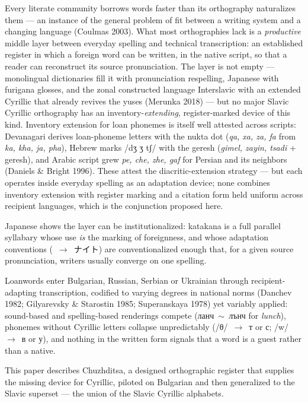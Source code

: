 \documentclass[12pt]{article}
\newcommand{\cz}[1]{{\chu #1}}
\newcommand{\ph}[1]{{\ipafont/#1/}}
\newcommand{\phon}[1]{{\ipafont[#1]}}
\newcommand{\src}[1]{{\ipafont #1}}
\begin{document}
Every literate community borrows words faster than its orthography naturalizes them — an instance of the general problem of fit between a writing system and a changing language (Coulmas 2003). What most orthographies lack is a \emph{productive} middle layer between everyday spelling and technical transcription: an established register in which a foreign word can be written, in the native script, so that a reader can reconstruct its source pronunciation. The layer is not empty — monolingual dictionaries fill it with pronunciation respelling, Japanese with furigana glosses, and the zonal constructed language Interslavic with an extended Cyrillic that already revives the yuses (Merunka 2018) — but no major Slavic Cyrillic orthography has an inventory-\emph{extending}, register-marked device of this kind. Inventory extension for loan phonemes is itself well attested across scripts: Devanagari derives loan-phoneme letters with the nukta dot (\emph{qa, xa, za, fa} from \emph{ka, kha, ja, pha}), Hebrew marks \ph{dʒ ʒ tʃ} with the geresh (\emph{gimel, zayin, tsadi} + geresh), and Arabic script grew \emph{pe, che, zhe, gaf} for Persian and its neighbors (Daniels \& Bright 1996). These attest the diacritic-extension strategy — but each operates inside everyday spelling as an adaptation device; none combines inventory extension with register marking and a citation form held uniform across recipient languages, which is the conjunction proposed here.

Japanese shows the layer can be institutionalized: katakana is a full parallel syllabary whose use \emph{is} the marking of foreignness, and whose adaptation conventions (\phon{naɪt}~$\rightarrow$~\src{ナイト}) are conventionalized enough that, for a given source pronunciation, writers usually converge on one spelling.

Loanwords enter Bulgarian, Russian, Serbian or Ukrainian through recipient-adapting transcription, codified to varying degrees in national norms (Danchev 1982; Gilyarevsky \& Starostin 1985; Superanskaya 1978) yet variably applied: sound-based and spelling-based renderings compete (\cz{ланч}~$\sim$~\cz{лънч} for \emph{lunch}), phonemes without Cyrillic letters collapse unpredictably (\ph{θ}~$\rightarrow$~т or с; \ph{w}~$\rightarrow$~в or у), and nothing in the written form signals that a word is a guest rather than a native.

This paper describes Chuzhditsa, a designed orthographic register that supplies the missing device for Cyrillic, piloted on Bulgarian and then generalized to the Slavic superset — the union of the Slavic Cyrillic alphabets.
\end{document}
